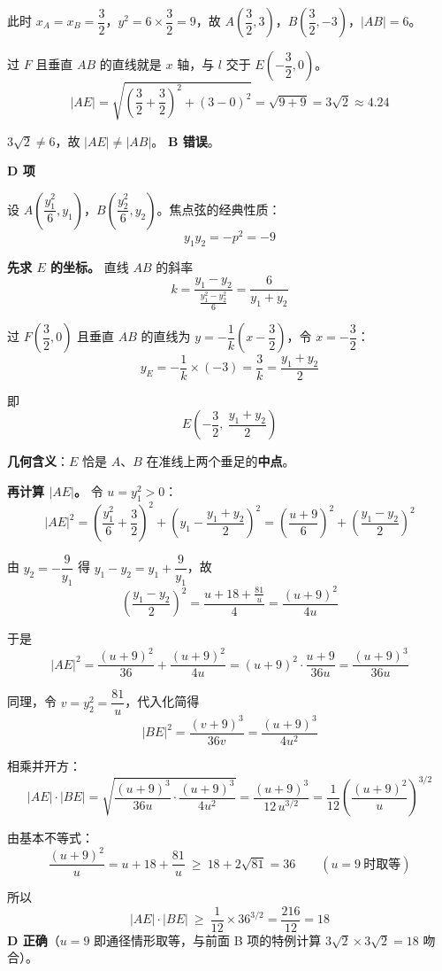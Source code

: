 此时 $x_A=x_B=\dfrac32$，$y^2=6\times\dfrac32=9$，故 $A\left(\dfrac32,3\right)$，$B\left(\dfrac32,-3\right)$，$|AB|=6$。

过 $F$ 且垂直 $AB$ 的直线就是 $x$ 轴，与 $l$ 交于 $E\left(-\dfrac32,0\right)$。
\[|AE|=\sqrt{\left(\frac32+\frac32\right)^2+(3-0)^2}=\sqrt{9+9}=3\sqrt2\approx4.24\]

$3\sqrt2\ne6$，故 $|AE|\ne|AB|$。 \textbf{B 错误}。

\par\medskip

\textbf{D 项}

设 $A\left(\dfrac{y_1^2}{6},y_1\right)$，$B\left(\dfrac{y_2^2}{6},y_2\right)$。焦点弦的经典性质：
\[y_1y_2=-p^2=-9\]

\textbf{先求 $E$ 的坐标。} 直线 $AB$ 的斜率
\[k=\frac{y_1-y_2}{\frac{y_1^2-y_2^2}{6}}=\frac{6}{y_1+y_2}\]

过 $F\left(\dfrac32,0\right)$ 且垂直 $AB$ 的直线为 $y=-\dfrac1k\left(x-\dfrac32\right)$，令 $x=-\dfrac32$：
\[y_E=-\frac1k\times(-3)=\frac3k=\frac{y_1+y_2}{2}\]

即
\[E\left(-\frac32,\ \frac{y_1+y_2}{2}\right)\]

\textbf{几何含义}：$E$ 恰是 $A$、$B$ 在准线上两个垂足的\textbf{中点}。

\textbf{再计算 $|AE|$。} 令 $u=y_1^2>0$：
\[|AE|^2=\left(\frac{y_1^2}{6}+\frac32\right)^2+\left(y_1-\frac{y_1+y_2}{2}\right)^2=\left(\frac{u+9}{6}\right)^2+\left(\frac{y_1-y_2}{2}\right)^2\]

由 $y_2=-\dfrac9{y_1}$ 得 $y_1-y_2=y_1+\dfrac9{y_1}$，故
\[\left(\frac{y_1-y_2}{2}\right)^2=\frac{u+18+\frac{81}{u}}{4}=\frac{(u+9)^2}{4u}\]

于是
\[|AE|^2=\frac{(u+9)^2}{36}+\frac{(u+9)^2}{4u}=(u+9)^2\cdot\frac{u+9}{36u}=\frac{(u+9)^3}{36u}\]

同理，令 $v=y_2^2=\dfrac{81}{u}$，代入化简得
\[|BE|^2=\frac{(v+9)^3}{36v}=\frac{(u+9)^3}{4u^2}\]

相乘并开方：
\[|AE|\cdot|BE|=\sqrt{\frac{(u+9)^3}{36u}\cdot\frac{(u+9)^3}{4u^2}}=\frac{(u+9)^3}{12\,u^{3/2}}=\frac1{12}\left(\frac{(u+9)^2}{u}\right)^{3/2}\]

由基本不等式：
\[\frac{(u+9)^2}{u}=u+18+\frac{81}{u}\ \ge\ 18+2\sqrt{81}=36\qquad(u=9\ \text{时取等})\]

所以
\[|AE|\cdot|BE|\ \ge\ \frac1{12}\times36^{3/2}=\frac{216}{12}=18\]
 \textbf{D 正确}（$u=9$ 即通径情形取等，与前面 B 项的特例计算 $3\sqrt2\times3\sqrt2=18$ 吻合）。


